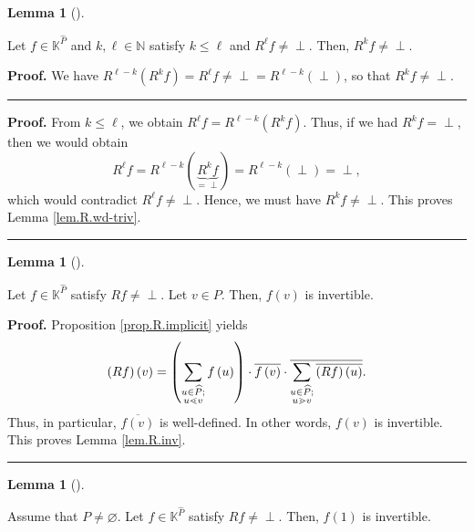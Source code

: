 \documentclass[numbers=enddot,12pt,final,onecolumn,notitlepage]{scrartcl}%
\theoremstyle{definition}
\newtheorem{lem}[theo]{Lemma}
\newenvironment{lemma}[1][]
{\begin{lem}[#1]\begin{leftbar}}
{\end{leftbar}\end{lem}}
\newenvironment{verlong}{}{}
\newenvironment{vershort}{}{}
\newcommand{\undf}{\operatorname*{\bot}}
\newenvironment{proof}[1][Proof]{\noindent\textbf{#1.} }{\ \rule{0.5em}{0.5em}}
\let\sumnonlimits\sum
\renewcommand{\sum}{\sumnonlimits\limits}
\begin{document}
\begin{lemma}
\label{lem.R.wd-triv}Let $f\in\mathbb{K}^{\widehat{P}}$ and $k,\ell
\in\mathbb{N}$ satisfy $k\leq\ell$ and $R^{\ell}f\neq\undf$. Then, $R^{k}%
f\neq\undf$.
\end{lemma}

\begin{vershort}
\begin{proof}
We have $R^{\ell-k}\left(  R^{k}f\right)  =R^{\ell}f\neq\undf=R^{\ell
-k}\left(  \undf\right)  $, so that $R^{k}f\neq\undf$.
\end{proof}
\end{vershort}

\begin{verlong}
\begin{proof}
From $k\leq\ell$, we obtain $R^{\ell}f=R^{\ell-k}\left(  R^{k}f\right)  $.
Thus, if we had $R^{k}f=\undf$, then we would obtain%
\[
R^{\ell}f=R^{\ell-k}\left(  \underbrace{R^{k}f}_{=\undf}\right)  =R^{\ell
-k}\left(  \undf\right)  =\undf,
\]
which would contradict $R^{\ell}f\neq\undf$. Hence, we must have $R^{k}%
f\neq\undf$. This proves Lemma \ref{lem.R.wd-triv}.
\end{proof}
\end{verlong}

\begin{lemma}
\label{lem.R.inv}Let $f\in\mathbb{K}^{\widehat{P}}$ satisfy $Rf\neq\undf$. Let
$v\in P$. Then, $f\left(  v\right)  $ is invertible.
\end{lemma}

\begin{proof}
Proposition \ref{prop.R.implicit} yields
\[
\left(  Rf\right)  \left(  v\right)  =\left(  \sum\limits_{\substack{u\in
\widehat{P};\\u\lessdot v}}f\left(  u\right)  \right)  \cdot\overline{f\left(
v\right)  }\cdot\overline{\sum\limits_{\substack{u\in\widehat{P};\\u\gtrdot
v}}\overline{\left(  Rf\right)  \left(  u\right)  }}.
\]
Thus, in particular, $\overline{f\left(  v\right)  }$ is well-defined. In
other words, $f\left(  v\right)  $ is invertible. This proves Lemma
\ref{lem.R.inv}.
\end{proof}

\begin{lemma}
\label{lem.R.1inv}Assume that $P\neq\varnothing$. Let $f\in\mathbb{K}%
^{\widehat{P}}$ satisfy $Rf\neq\undf$. Then, $f\left(  1\right)  $ is invertible.
\end{lemma}
\end{document}
